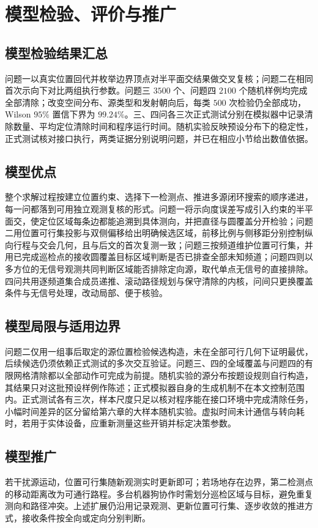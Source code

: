 \section{模型检验、评价与推广}

\subsection{模型检验结果汇总}

问题一以真实位置回代并枚举边界顶点对半平面交结果做交叉复核；问题二在相同首次示向下对比两组执行参数。问题三 $3500$ 个、问题四 $2100$ 个随机样例均完成全部清除；改变空间分布、源类型和发射朝向后，每类 $500$ 次检验仍全部成功，Wilson $95\%$ 置信下界为 $99.24\%$。三、四问各三次正式测试分别在模拟器中记录清除数量、平均定位清除时间和程序运行时间。随机实验反映预设分布下的稳定性，正式测试核对接口执行，两类证据分别说明问题，并已在相应小节给出数值依据。

\subsection{模型优点}

整个求解过程按建立位置约束、选择下一检测点、推进多源闭环搜索的顺序递进，每一问都落到可用独立观测复核的形式。问题一将示向度误差写成引入约束的半平面交，使定位区域每条边都能追溯到具体测向，并把直径与圆覆盖分开检验；问题二用位置可行集投影与双侧偏移给出明确候选区域，前移比例与侧移距分别控制纵向行程与交会几何，且与后文的首次复测一致；问题三按频道维护位置可行集，并用已完成巡检点的接收圆覆盖目标区域判断是否已排查全部未知频道；问题四则以多方位的无信号观测共同判断区域能否排除定向源，取代单点无信号的直接排除。四问共用逐频道集合成员递推、滚动路径规划与保守清除的内核，问间只更换覆盖条件与无信号处理，改动局部、便于核验。

\subsection{模型局限与适用边界}

问题二仅用一组事后取定的源位置检验候选构造，未在全部可行几何下证明最优，后续候选仍须依赖正式测试的多次交互验证。问题三、四的全域覆盖与问题四的有限网格清除都以全部动作可完成为前提。随机实验的源分布按题设规则自行构造，其结果只对这批预设样例作陈述；正式模拟器自身的生成机制不在本文控制范围内。正式测试各有三次，样本尺度只足以核对程序能在接口环境中完成清除任务，小幅时间差异的区分留给第六章的大样本随机实验。虚拟时间未计通信与转向耗时，若用于实体设备，应重新测量这些开销并标定决策参数。

\subsection{模型推广}

若干扰源运动，位置可行集随新观测实时更新即可；若场地存在边界，第二检测点的移动距离改为可通行路程。多台机器狗协作时需划分巡检区域与目标，避免重复测向和路径冲突。上述扩展仍沿用记录观测、更新位置可行集、逐步收敛的推进方式，接收条件按全向或定向分别判断。